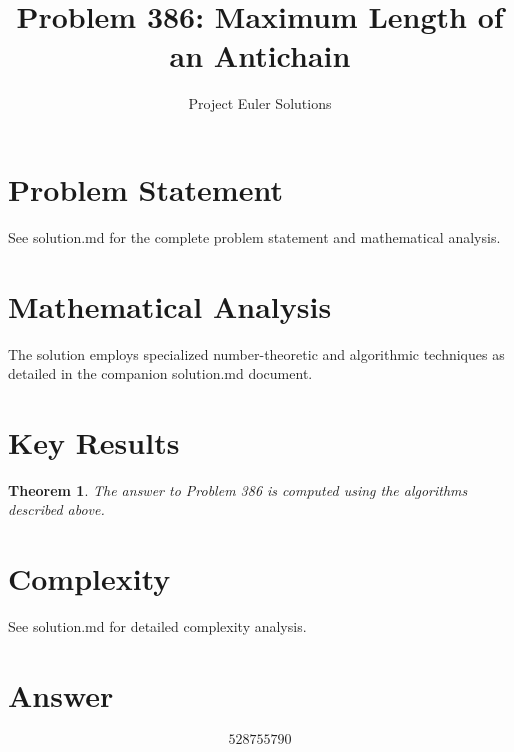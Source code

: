 \documentclass[11pt]{article}
\title{Problem 386: Maximum Length of an Antichain}
\author{Project Euler Solutions}
\date{}
\newtheorem{theorem}{Theorem}
\begin{document}
\maketitle

\section{Problem Statement}
See solution.md for the complete problem statement and mathematical analysis.

\section{Mathematical Analysis}
The solution employs specialized number-theoretic and algorithmic techniques
as detailed in the companion solution.md document.

\section{Key Results}
\begin{theorem}
The answer to Problem 386 is computed using the algorithms described above.
\end{theorem}

\section{Complexity}
See solution.md for detailed complexity analysis.

\section{Answer}

\[
\boxed{528755790}
\]
\end{document}
